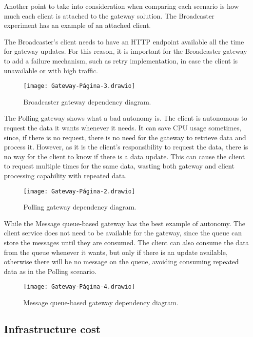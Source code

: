 Another point to take into consideration when comparing each scenario is how much each client is attached to the gateway solution. The Broadcaster experiment has an example of an attached client.

The Broadcaster's client needs to have an HTTP endpoint available all the time for gateway updates. For this reason, it is important for the Broadcaster gateway to add a failure mechanism, such as retry implementation, in case the client is unavailable or with high traffic.

\begin{figure}
    \centering
    \texttt{[image: Gateway-Página-3.drawio]}
    \caption{Broadcaster gateway dependency diagram.\label{fig:subfigures6}}
\end{figure}

The Polling gateway shows what a bad autonomy is. The client is autonomous to request the data it wants whenever it needs. It can save CPU usage sometimes, since, if there is no request, there is no need for the gateway to retrieve data and process it. However, as it is the client's responsibility to request the data, there is no way for the client to know if there is a data update. This can cause the client to request multiple times for the same data, wasting both gateway and client processing capability with repeated data.

\begin{figure}
    \centering
    \texttt{[image: Gateway-Página-2.drawio]}
    \caption{Polling gateway dependency diagram.\label{fig:subfigures7}}
\end{figure}

While the Message queue-based gateway has the best example of autonomy. The client service does not need to be available for the gateway, since the queue can store the messages until they are consumed. The client can also consume the data from the queue whenever it wants, but only if there is an update available, otherwise there will be no message on the queue, avoiding consuming repeated data as in the Polling scenario.

\begin{figure}
    \centering
    \texttt{[image: Gateway-Página-4.drawio]}
    \caption{Message queue-based gateway dependency diagram.\label{fig:subfigures8}}
\end{figure}

\subsection*{Infrastructure cost}
\label{sec:infra}

